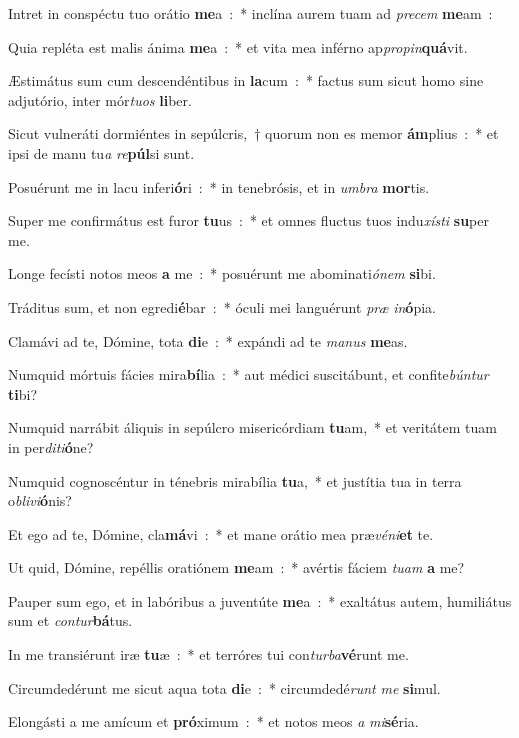 ﻿\item Intret in conspéctu tuo orátio \textbf{me}a~:~* inclína aurem tuam ad \emph{pre}\emph{cem} \textbf{me}am~:
\item Quia repléta est malis ánima \textbf{me}a~:~* et vita mea inférno ap\emph{pro}\emph{pin}\textbf{quá}vit.
\item Æstimátus sum cum descendéntibus in \textbf{la}cum~:~* factus sum sicut homo sine adjutório, inter mór\emph{tu}\emph{os} \textbf{li}ber.
\item Sicut vulneráti dormiéntes in sepúlcris,~† quorum non es memor \textbf{ám}plius~:~* et ipsi de manu tu\emph{a} \emph{re}\textbf{púl}si sunt.
\item Posuérunt me in lacu inferi\textbf{ó}ri~:~* in tenebrósis, et in \emph{um}\emph{bra} \textbf{mor}tis.
\item Super me confirmátus est furor \textbf{tu}us~:~* et omnes fluctus tuos indu\emph{xí}\emph{sti} \textbf{su}per me.
\item Longe fecísti notos meos \textbf{a} me~:~* posuérunt me abominati\emph{ó}\emph{nem} \textbf{si}bi.
\item Tráditus sum, et non egredi\textbf{é}bar~:~* óculi mei languérunt \emph{præ} \emph{in}\textbf{ó}pia.
\item Clamávi ad te, Dómine, tota \textbf{di}e~:~* expándi ad te \emph{ma}\emph{nus} \textbf{me}as.
\item Numquid mórtuis fácies mira\textbf{bí}lia~:~* aut médici suscitábunt, et confite\emph{bún}\emph{tur} \textbf{ti}bi?
\item Numquid narrábit áliquis in sepúlcro misericórdiam \textbf{tu}am,~* et veritátem tuam in per\emph{di}\emph{ti}\textbf{ó}ne?
\item Numquid cognoscéntur in ténebris mirabília \textbf{tu}a,~* et justítia tua in terra o\emph{bli}\emph{vi}\textbf{ó}nis?
\item Et ego ad te, Dómine, cla\textbf{má}vi~:~* et mane orátio mea præ\emph{vé}\emph{ni}\textbf{et} te.
\item Ut quid, Dómine, repéllis oratiónem \textbf{me}am~:~* avértis fáciem \emph{tu}\emph{am} \textbf{a} me?
\item Pauper sum ego, et in labóribus a juventúte \textbf{me}a~:~* exaltátus autem, humiliátus sum et \emph{con}\emph{tur}\textbf{bá}tus.
\item In me transiérunt iræ \textbf{tu}æ~:~* et terróres tui con\emph{tur}\emph{ba}\textbf{vé}runt me.
\item Circumdedérunt me sicut aqua tota \textbf{di}e~:~* circumdedé\emph{runt} \emph{me} \textbf{si}mul.
\item Elongásti a me amícum et \textbf{pró}ximum~:~* et notos meos \emph{a} \emph{mi}\textbf{sé}ria.